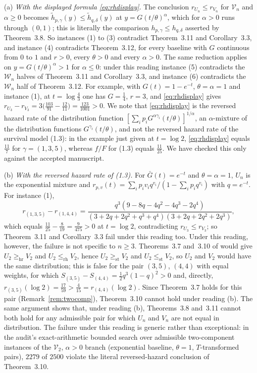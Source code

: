 \documentclass[10pt]{article}
\theoremstyle{plain}
\theoremstyle{definition}
\theoremstyle{remark}
\newcommand{\hr}{\mathrm{hr}}
\newcommand{\st}{\mathrm{st}}
\begin{document}
(a) \emph{With the displayed formula \eqref{eq:rhdisplay}.} The conclusion $r_{U_n}\le r_{V_n}$ for $\mathcal V_n$ and $\alpha\ge0$ becomes $\tilde h_{p,\gamma}(y)\le\tilde h_{q,\delta}(y)$ at $y=G(t/\theta)^\alpha$, which for $\alpha>0$ runs through $(0,1)$; this is literally the comparison $h_{p,\gamma}\le h_{q,\delta}$ asserted by Theorem~3.8. So instances (1) to (3) contradict Theorem~3.11 and Corollary~3.3, and instance (4) contradicts Theorem~3.12, for every baseline with $G$ continuous from $0$ to $1$ and $r>0$, every $\theta>0$ and every $\alpha>0$. The same reduction applies on $y=G(t/\theta)^\alpha>1$ for $\alpha\le0$: under this reading instance (5) contradicts the $\mathcal W_n$ halves of Theorem~3.11 and Corollary~3.3, and instance (6) contradicts the $\mathcal W_n$ half of Theorem~3.12. For example, with $G(t)=1-e^{-t}$, $\theta=\alpha=1$ and instance (1), at $t=\log\tfrac43$ one has $G=\tfrac14$, $r=3$, and \eqref{eq:rhdisplay} gives $r_{U_3}-r_{V_3}=3\bigl(\tfrac{103}{91}-\tfrac{12}{11}\bigr)=\tfrac{123}{1001}>0$. We note that \eqref{eq:rhdisplay} is the reversed hazard rate of the distribution function $[\sum_ip_iG^{\alpha\gamma_i}(t/\theta)]^{1/\alpha}$, an $\alpha$-mixture of the distribution functions $G^{\gamma_i}(t/\theta)$, and not the reversed hazard rate of the survival model (1.3): in the example just given at $t=\log 2$, \eqref{eq:rhdisplay} equals $\tfrac{11}{7}$ for $\gamma=(1,3,5)$, whereas $f/F$ for (1.3) equals $\tfrac{11}{25}$. We have checked this only against the accepted manuscript.

(b) \emph{With the reversed hazard rate of (1.3).} For $\bar G(t)=e^{-t}$ and $\theta=\alpha=1$, $U_n$ is the exponential mixture and $r_{p,v}(t)=\sum_ip_iv_iq^{v_i}/(1-\sum_ip_iq^{v_i})$ with $q=e^{-t}$. For instance (1),
\[
r_{(1,3,5)}-r_{(1,4,4)}=\frac{q^3(9-8q-4q^2-4q^3-2q^4)}{(3+2q+2q^2+q^3+q^4)(3+2q+2q^2+2q^3)},
\]
which equals $\tfrac{11}{25}-\tfrac{8}{19}=\tfrac{9}{475}>0$ at $t=\log2$, contradicting $r_{U_3}\le r_{V_3}$; so Theorem~3.11 and Corollary~3.3 fail under this reading too. Under this reading, however, the failure is not specific to $n\ge3$. Theorems~3.7 and~3.10 of \cite{SahooKayalFinkelstein2026} would give $U_2\ge_{\hr}V_2$ and $U_2\le_{\mathrm{rh}}V_2$, hence $U_2\ge_{\st}V_2$ and $U_2\le_{\st}V_2$, so $U_2$ and $V_2$ would have the same distribution; this is false for the pair $(3,5)$, $(4,4)$ with equal weights, for which $S_{(3,5)}-S_{(4,4)}=\tfrac12q^3(1-q)^2>0$ and, directly, $r_{(3,5)}(\log2)=\tfrac{17}{59}>\tfrac{4}{15}=r_{(4,4)}(\log2)$. Since Theorem~3.7 holds for this pair (Remark~\ref{rem:twocomp}), Theorem~3.10 cannot hold under reading (b). The same argument shows that, under reading (b), Theorems~3.8 and~3.11 cannot both hold for any admissible pair for which $U_n$ and $V_n$ are not equal in distribution. The failure under this reading is generic rather than exceptional: in the audit's exact-arithmetic bounded search over admissible two-component instances of the $\mathcal V_2$, $\alpha>0$ branch (exponential baseline, $\theta=1$, $T$-transformed pairs), $2279$ of $2500$ violate the literal reversed-hazard conclusion of Theorem~3.10.
\end{document}
